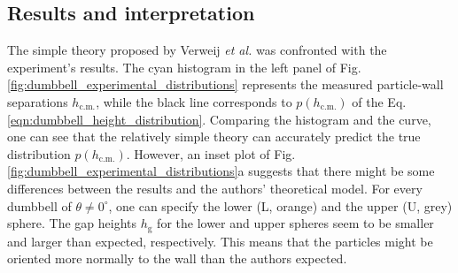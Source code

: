 \documentclass{master_thesis}
\begin{document}
\subsection{Results and interpretation}

The simple theory proposed by Verweij \textit{et al.} \cite{verweij2021} was confronted with the experiment's results. The cyan histogram in the left panel of Fig. \ref{fig:dumbbell_experimental_distributions} represents the measured particle-wall separations $h_{\textrm{c.m.}}$, while the black line corresponds to $p(h_{\textrm{c.m.}})$ of the Eq. \eqref{eqn:dumbbell_height_distribution}. Comparing the histogram and the curve, one can see that the relatively simple theory can accurately predict the true distribution $p(h_{\textrm{c.m.}})$. However, an inset plot of Fig. \ref{fig:dumbbell_experimental_distributions}a suggests that there might be some differences between the results and the authors' theoretical model. For every dumbbell of $\theta \neq 0^{\circ}$, one can specify the lower (L, orange) and the upper (U, grey) sphere. The gap heights $h_{\textrm{g}}$ for the lower and upper spheres seem to be smaller and larger than expected, respectively. This means that the particles might be oriented more normally to the wall than the authors expected.
\end{document}

